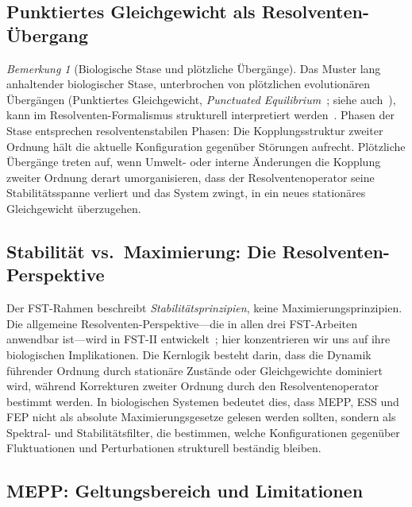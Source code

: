 \documentclass[12pt,a4paper]{article}
\theoremstyle{remark}
\newtheorem{remark}{Bemerkung}
\begin{document}
\subsection{Punktiertes Gleichgewicht als Resolventen-Übergang}
\begin{remark}[Biologische Stase und plötzliche Übergänge]
\label{rem:punctuated-equilibrium}
Das Muster lang anhaltender biologischer Stase, unterbrochen von plötzlichen evolutionären Übergängen (Punktiertes Gleichgewicht, \emph{Punctuated Equilibrium}~\citep{GouldEldredge1977}; siehe auch~\citealp{KauffmanOrigins}), kann im Resolventen-Formalismus strukturell interpretiert werden~\citep{GeigerRH2026b}. Phasen der Stase entsprechen resolventenstabilen Phasen: Die Kopplungsstruktur zweiter Ordnung hält die aktuelle Konfiguration gegenüber Störungen aufrecht. Plötzliche Übergänge treten auf, wenn Umwelt- oder interne Änderungen die Kopplung zweiter Ordnung derart umorganisieren, dass der Resolventenoperator seine Stabilitätsspanne verliert und das System zwingt, in ein neues stationäres Gleichgewicht überzugehen.
\end{remark}

\subsection{Stabilität vs.\ Maximierung: Die Resolventen-Perspektive}

Der FST-Rahmen beschreibt \emph{Stabilitätsprinzipien}, keine Maximierungsprinzipien. Die allgemeine Resolventen-Perspektive---die in allen drei FST-Arbeiten anwendbar ist---wird in FST-II entwickelt~\citep{FSTII}; hier konzentrieren wir uns auf ihre biologischen Implikationen. Die Kernlogik besteht darin, dass die Dynamik führender Ordnung durch stationäre Zustände oder Gleichgewichte dominiert wird, während Korrekturen zweiter Ordnung durch den Resolventenoperator bestimmt werden. In biologischen Systemen bedeutet dies, dass MEPP, ESS und FEP nicht als absolute Maximierungsgesetze gelesen werden sollten, sondern als Spektral- und Stabilitätsfilter, die bestimmen, welche Konfigurationen gegenüber Fluktuationen und Perturbationen strukturell beständig bleiben.

\subsection{MEPP: Geltungsbereich und Limitationen}
\end{document}
